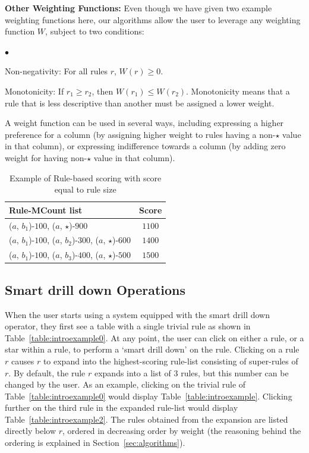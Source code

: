 \documentclass[10pt,journal,compsoc]{IEEEtran}
\newcommand{\squishlist}{
   \begin{list}{$\bullet$}
    { \setlength{\itemsep}{0pt}
      \setlength{\parsep}{2pt}
      \setlength{\topsep}{2pt}
      \setlength{\partopsep}{0pt}
    }
}
\newcommand{\stitle}[1]{\vspace{0.5em}\noindent\textbf{#1}}
\newcommand{\squishend}{\end{list}}
\newcommand{\techreporttext}[1]{#1}
\begin{document}
\smallskip

\stitle{Other Weighting Functions:}
Even though we have given two example weighting functions here, our algorithms allow the user to leverage any weighting function $W$, subject to two conditions:
\squishlist
\item Non-negativity: For all rules $r$, $W(r) \geq 0$.
\item Monotonicity: If $r_1 \geq r_2$, then $W(r_1) \leq W(r_2)$. Monotonicity means that a rule that is less descriptive than another must be assigned a lower weight.
\squishend
A weight function can be used in several ways, including expressing a higher preference for a column (by assigning higher weight to rules having a non-$\star$ value in that column), or expressing indifference towards a column (by adding zero weight for having non-$\star$ value in that column).

\techreporttext{
\begin{table}
\centering
\scriptsize
\begin{tabular}{ | l | c | }
 \hline Rule-MCount list & Score \\ \hline
  ($a$, $b_1$)-$100$, ($a$, $\star$)-$900$ & $1100$ \\
  ($a$, $b_1$)-$100$, ($a$, $b_2$)-$300$, ($a$, $\star$)-$600$ & $1400$  \\
  ($a$, $b_1$)-$100$, ($a$, $b_3$)-$400$, ($a$, $\star$)-$500$ & $1500$ \\ \hline
\end{tabular}
\caption{Example of Rule-based scoring with score equal to rule size \label{table:sizescoringexample}}
\end{table}
}

\subsection{Smart drill down Operations}
\label{sec:interface}
When the user starts using a system equipped with
the smart drill down operator, they first see a table with a single trivial rule as shown in Table~\ref{table:introexample0}. At any point, the user can click on either a rule, or a star within a rule, to perform a `smart drill down' on the rule. Clicking on a rule $r$ causes $r$ to expand into the highest-scoring rule-list consisting of super-rules of $r$. By default, the rule $r$ expands into a list of $3$ rules, but this number can be changed by the user.\techreporttext{ As an example, clicking on the trivial rule of Table~\ref{table:introexample0} would display Table~\ref{table:introexample}. Clicking further on the third rule in the expanded rule-list would display Table~\ref{table:introexample2}.} The rules obtained from the expansion are listed directly below $r$, ordered in decreasing order by weight (the reasoning behind the ordering is explained in Section~\ref{sec:algorithms}).
\end{document}
